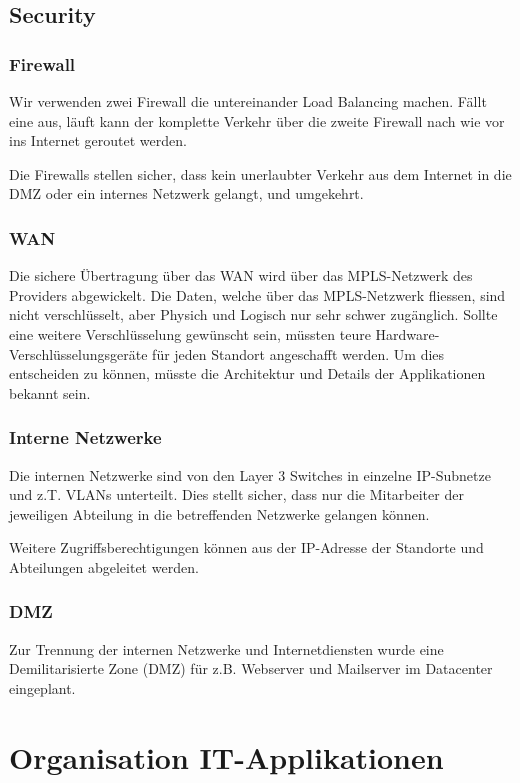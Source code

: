 \subsection{Security}

\subsubsection{Firewall}
Wir verwenden zwei Firewall die untereinander Load Balancing machen. Fällt eine aus, läuft kann der komplette Verkehr über die zweite Firewall nach wie vor ins Internet geroutet werden.

Die Firewalls stellen sicher, dass kein unerlaubter Verkehr aus dem Internet in die DMZ oder ein internes Netzwerk gelangt, und umgekehrt.

\subsubsection{WAN}
Die sichere Übertragung über das WAN wird über das MPLS-Netzwerk des Providers abgewickelt. Die Daten, welche über das MPLS-Netzwerk fliessen, sind nicht verschlüsselt, aber Physich und Logisch nur sehr schwer zugänglich. Sollte eine weitere Verschlüsselung gewünscht sein, müssten teure Hardware-Verschlüsselungsgeräte für jeden Standort angeschafft werden. Um dies entscheiden zu können, müsste die Architektur und Details der Applikationen bekannt sein.

\subsubsection{Interne Netzwerke}

Die internen Netzwerke sind von den Layer 3 Switches in einzelne IP-Subnetze und z.T. VLANs unterteilt. Dies stellt sicher, dass nur die Mitarbeiter der jeweiligen Abteilung in die betreffenden Netzwerke gelangen können.

Weitere Zugriffsberechtigungen können aus der IP-Adresse der Standorte und Abteilungen abgeleitet werden.

\subsubsection{DMZ}

Zur Trennung der internen Netzwerke und Internetdiensten wurde eine Demilitarisierte Zone (DMZ) für z.B. Webserver und Mailserver im Datacenter eingeplant.

\section{Organisation IT-Applikationen}

